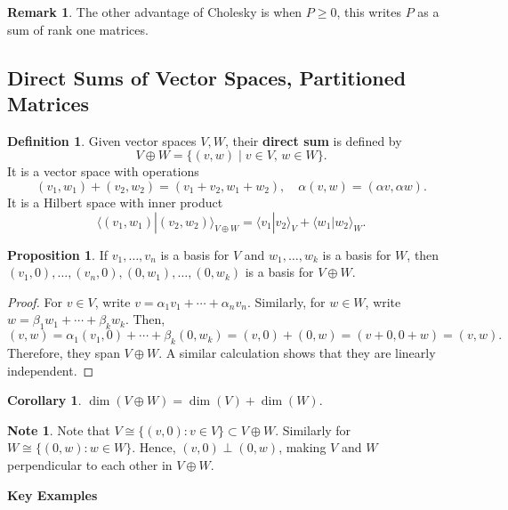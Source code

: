 \documentclass[12pt]{article}
\theoremstyle{definition}
\newtheorem*{corollary}{Corollary}
\newtheorem*{proposition}{Proposition}
\newtheorem*{definition}{Definition}
\newtheorem*{remark}{Remark}
\newtheorem*{note}{Note}
\begin{document}
\begin{remark}
The other advantage of Cholesky is when $P \geq 0$, this writes $P$ as a sum of rank one matrices.
\end{remark}

\subsection{Direct Sums of Vector Spaces, Partitioned Matrices}

\begin{definition}
Given vector spaces $V, W$, their \textbf{direct sum} is defined by
\[
V \oplus W = \{(v,w) \mid v \in V,\, w \in W\}.
\]
It is a vector space with operations
\[
(v_1,w_1) + (v_2,w_2) = (v_1+v_2,w_1+w_2),\quad \alpha(v,w) = (\alpha v, \alpha w).
\]
It is a Hilbert space with inner product
\[
\langle (v_1,w_1) | (v_2,w_2) \rangle_{V \oplus W} = \langle v_1|v_2\rangle_V + \langle w_1|w_2\rangle_W.
\]
\end{definition}

\begin{proposition}
If $v_1,\ldots,v_n$ is a basis for $V$ and $w_1,\ldots,w_k$ is a basis for $W$, then $(v_1,0),\ldots,(v_n,0),(0,w_1),\ldots,(0,w_k)$ is a basis for $V \oplus W$.
\end{proposition}

\begin{proof}
For $v \in V$, write $v = \alpha_1 v_1 + \cdots + \alpha_n v_n$. Similarly, for $w \in W$, write $w = \beta_1 w_1 + \cdots + \beta_k w_k$. Then,
\[
(v,w) = \alpha_1(v_1,0) + \cdots + \beta_k(0,w_k) = (v,0) + (0,w) = (v+0,0+w) = (v,w).
\]
Therefore, they span $V \oplus W$. A similar calculation shows that they are linearly independent.
\end{proof}

\begin{corollary}
$\dim(V \oplus W) = \dim(V) + \dim(W)$.
\end{corollary}

\begin{note}
Note that $V \cong \{(v,0) : v \in V\} \subset V \oplus W$. Similarly for $W \cong \{(0,w) : w \in W\}$. Hence, $(v,0) \perp (0,w)$, making $V$ and $W$ perpendicular to each other in $V \oplus W$.
\end{note}

\textbf{Key Examples}
\end{document}
